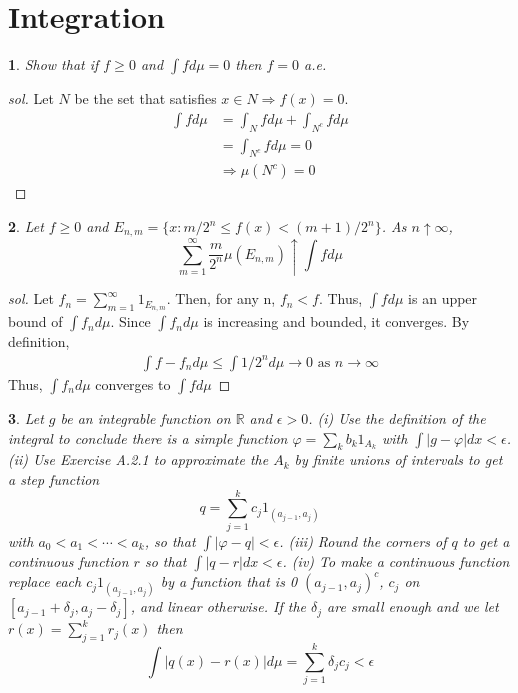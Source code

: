 \documentclass{report}
\newtheorem{ex}{}[section]
\begin{document}
\section{Integration}
\begin{ex}
Show that if $f \ge 0$ and $\int f d\mu = 0$ then $f = 0$ a.e.
\end{ex}
\begin{proof}[sol]
Let $N$ be the set that satisfies $x \in N \Rightarrow f(x) = 0$.
\begin{align*}
    \int f d\mu &=  \int_N f d\mu  + \int_{N^c} f d\mu\\
    &= \int_{N^c} f d\mu = 0\\
    &\Rightarrow \mu(N^c) = 0
\end{align*}
\end{proof}
\begin{ex}
Let $f \ge 0$ and $E_{n,m} = \{x : m/2^n \le f(x) < (m+1)/2^n\}$. As $n \uparrow \infty$,
\[\sum_{m=1}^\infty \frac{m}{2^n} \mu(E_{n,m}) \uparrow \int f d\mu\]
\end{ex}
\begin{proof}[sol]
Let $f_n = \sum_{m=1}^\infty 1_{E_{n,m}}$. Then, for any n, $f_n < f$. Thus, $\int f d\mu$ is an upper bound of $\int f_n d\mu$. Since $\int f_n d\mu$ is increasing and bounded, it converges. By definition,
\begin{align*}
    \int f -f_n d\mu \le \int 1/2^n d\mu \to 0 \text{ as } n \to \infty
\end{align*}
Thus, $\int f_n d\mu$ converges to $\int f d\mu$
\end{proof}
\begin{ex}
Let $g$ be an integrable function on $\mathbb{R}$ and $\epsilon > 0$. (i) Use the definition of the integral to conclude there is a simple function $\varphi = \sum_k b_k1_{A_k}$ with $\int |g - \varphi| dx < \epsilon$. (ii) Use Exercise A.2.1 to approximate the $A_k$ by finite unions of intervals to get a step function
\[q = \sum_{j=1}^k c_j 1_{(a_{j-1}, a_j)}\]
with $a_0 < a_1 < \dotsb < a_k$, so that $\int |\varphi-q| < \epsilon$. (iii) Round the corners of $q$ to get a continuous function $r$ so that $\int |q - r| dx < \epsilon$.
(iv) To make a continuous function replace each $c_j1_{(a_{j-1},a_j)}$ by a function
that is 0 $(a_{j-1}, a_j)^c$, $c_j$ on $[a_{j-1} + \delta_j, a_j - \delta_j ]$, and linear otherwise. If the $\delta_j$ are small enough and we let $r(x) = \sum^k_{j=1} r_j(x)$ then
\[\int |q(x) - r(x)|d\mu = \sum_{j=1}^k \delta_j c_j <\epsilon\]
\end{ex}
\end{document}
